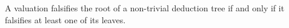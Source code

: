 

\setcounter{section}{2}
\setcounter{subsection}{6}
\setcounter{dfn}{15}

\begin{lem}
\label{lem:FalsifyRoot}
A valuation falsifies the root of a non-trivial deduction tree if and only if it falsifies at least one of its leaves.
\end{lem}


